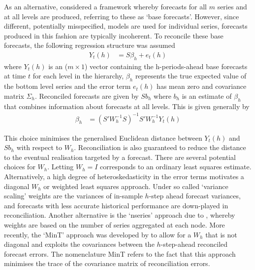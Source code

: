 \documentclass[a4paper,fleqn,11pt]{article}
\begin{document}
As an alternative, \cite{Hyndman2011} considered a framework whereby forecasts for all $m$ series and at all levels are produced, referring to these as `base forecasts'.  However, since different, potentially misspecified, models are used for individual series, forecasts produced in this fashion are typically incoherent. To reconcile these base forecasts, \cite{Hyndman2011} the following regression structure was assumed
\begin{align}
Y_t(h) &= S\beta_{h} + e_t(h)
\label{eq:regstruct}
\end{align}
where $Y_t(h)$ is an ($m \times 1$) vector containing the h-periods-ahead base forecasts at time $t$ for each level in the hierarchy, $\beta_{h}$ represents the true expected value of the bottom level series and the error term $e_t(h)$ has mean zero and covariance matrix $\Sigma_h$. Reconciled forecasts are given by $Sb_{h}$ where $b_h$ is an estimate of $\beta_{h}$ that combines information about forecasts at all levels.  This is given generally by
\begin{align}
\label{eq:reg}
\beta_{h} &= \left(S'W_h^{-1}S \right)^{-1} S'W_h^{-1}Y_t(h)
\end{align}

This choice minimises the generalised Euclidean distance between $Y_t(h)$ and $Sb_{h}$ with respect to $W_h$. Reconciliation is also guaranteed to reduce the distance to the eventual realisation targeted by a forecast. There are several potential choices for $W_h$.  Letting $W_h=I$ corresponds to an ordinary least squares estimate.  Alternatively, a high degree of heteroskedasticity in the error terms motivates a diagonal $W_h$ or weighted least squares approach. Under so called `variance scaling' weights are the variances of in-sample $h$-step ahead forecast variances, and forecasts with less accurate historical performance are down-played in reconciliation.  Another alternative is the `nseries' approach due to \cite{Athanasopoulos2017}, whereby weights are based on the number of series aggregated at each node.  More recently, the `MinT' approach was developed by \cite{Wickramasuriya2015} to allow for a $W_h$ that is not diagonal and exploits the covariances between the $h$-step-ahead reconciled forecast errors. The nomenclature MinT refers to the fact that this approach minimises the trace of the covariance matrix of reconciliation errors.  
\end{document}
